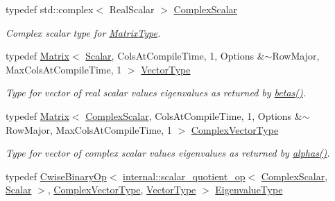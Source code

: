 \begin{DoxyCompactItemize}
\item 
typedef std\+::complex$<$ Real\+Scalar $>$ \mbox{\hyperlink{class_eigen_1_1_generalized_eigen_solver_abdec07af91db1345bb4c74066e3d0ea7}{Complex\+Scalar}}
\begin{DoxyCompactList}\small\item\em Complex scalar type for \mbox{\hyperlink{class_eigen_1_1_generalized_eigen_solver_a56f4b9823bb9a267de3aaf48428cd247}{Matrix\+Type}}. \end{DoxyCompactList}\item 
typedef \mbox{\hyperlink{class_eigen_1_1_matrix}{Matrix}}$<$ \mbox{\hyperlink{class_eigen_1_1_generalized_eigen_solver_afb318d0b097ff8dd5a7410d31317ca47}{Scalar}}, Cols\+At\+Compile\+Time, 1, Options \&$\sim$Row\+Major, Max\+Cols\+At\+Compile\+Time, 1 $>$ \mbox{\hyperlink{class_eigen_1_1_generalized_eigen_solver_a5aa3d1390c2b0d455c1c9b8b3101b119}{Vector\+Type}}
\begin{DoxyCompactList}\small\item\em Type for vector of real scalar values eigenvalues as returned by \mbox{\hyperlink{class_eigen_1_1_generalized_eigen_solver_abeaa6f56cee367b83fd09d428462ca0c}{betas()}}. \end{DoxyCompactList}\item 
typedef \mbox{\hyperlink{class_eigen_1_1_matrix}{Matrix}}$<$ \mbox{\hyperlink{class_eigen_1_1_generalized_eigen_solver_abdec07af91db1345bb4c74066e3d0ea7}{Complex\+Scalar}}, Cols\+At\+Compile\+Time, 1, Options \&$\sim$Row\+Major, Max\+Cols\+At\+Compile\+Time, 1 $>$ \mbox{\hyperlink{class_eigen_1_1_generalized_eigen_solver_acfd144329aca76882069da2fc5d53ef5}{Complex\+Vector\+Type}}
\begin{DoxyCompactList}\small\item\em Type for vector of complex scalar values eigenvalues as returned by \mbox{\hyperlink{class_eigen_1_1_generalized_eigen_solver_a82b1bc41267f46e5c5899d5b084a73bb}{alphas()}}. \end{DoxyCompactList}\item 
\mbox{\label{class_eigen_1_1_generalized_eigen_solver_ad59af178acc401f1bc4e330ef80f286d}} 
typedef \mbox{\hyperlink{class_eigen_1_1_cwise_binary_op}{Cwise\+Binary\+Op}}$<$ \mbox{\hyperlink{struct_eigen_1_1internal_1_1scalar__quotient__op}{internal\+::scalar\+\_\+quotient\+\_\+op}}$<$ \mbox{\hyperlink{class_eigen_1_1_generalized_eigen_solver_abdec07af91db1345bb4c74066e3d0ea7}{Complex\+Scalar}}, \mbox{\hyperlink{class_eigen_1_1_generalized_eigen_solver_afb318d0b097ff8dd5a7410d31317ca47}{Scalar}} $>$, \mbox{\hyperlink{class_eigen_1_1_generalized_eigen_solver_acfd144329aca76882069da2fc5d53ef5}{Complex\+Vector\+Type}}, \mbox{\hyperlink{class_eigen_1_1_generalized_eigen_solver_a5aa3d1390c2b0d455c1c9b8b3101b119}{Vector\+Type}} $>$ \mbox{\hyperlink{class_eigen_1_1_generalized_eigen_solver_ad59af178acc401f1bc4e330ef80f286d}{Eigenvalue\+Type}}

\end{DoxyCompactItemize}
